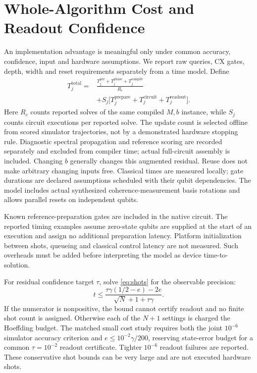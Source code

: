 \documentclass{ieeeaccess}
\begin{document}
\section{Whole-Algorithm Cost and Readout Confidence}\label{sec:completecost}
An implementation advantage is meaningful only under common accuracy, confidence, input and hardware assumptions. We report raw queries, CX gates, depth, width and reset requirements separately from a time model. Define
\begin{equation}\label{eq:totalcost}
\begin{aligned}
T_j^{\mathrm{total}}={}&\frac{T_j^{\mathrm{pre}}+T_j^{\mathrm{phase}}+T_j^{\mathrm{compile}}}{R_c}\\
&+S_j\bigl[T_j^{\mathrm{prepare}}+T_j^{\mathrm{circuit}}+T_j^{\mathrm{readout}}\bigr].
\end{aligned}
\end{equation}
Here $R_c$ counts reported solves of the same compiled $M,b$ instance, while $S_j$ counts circuit executions per reported solve. The update count is selected offline from scored simulator trajectories, not by a demonstrated hardware stopping rule. Diagnostic spectral propagation and reference scoring are recorded separately and excluded from compiler time; actual full-circuit assembly is included. Changing $b$ generally changes this augmented residual. Reuse does not make arbitrary changing inputs free. Classical times are measured locally; gate durations are declared assumptions scheduled with their qubit dependencies. The model includes actual synthesized coherence-measurement basis rotations and allows parallel resets on independent qubits.

Known reference-preparation gates are included in the native circuit. The reported timing examples assume zero-state qubits are supplied at the start of an execution and assign no additional preparation latency. Platform initialization between shots, queueing and classical control latency are not measured. Such overheads must be added before interpreting the model as device time-to-solution.

For residual confidence target $\tau$, solve \eqref{eq:shots} for the observable precision:
\begin{equation}\label{eq:precisionbudget}
t\le\frac{\tau\gamma(1/2-e)-2e}{\sqrt N+1+\tau\gamma}.
\end{equation}
If the numerator is nonpositive, the bound cannot certify readout and no finite shot count is assigned. Otherwise each of the $N+1$ settings is charged the Hoeffding budget. The matched small cost study requires both the joint $10^{-6}$ simulator accuracy criterion and $e\le10^{-2}\gamma/200$, reserving state-error budget for a common $\tau=10^{-2}$ readout certificate. Tighter $10^{-6}$ readout failures are reported. These conservative shot bounds can be very large and are not executed hardware shots.
\end{document}
